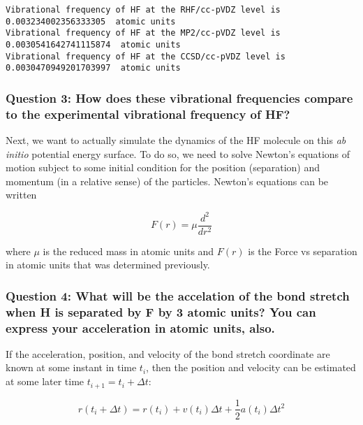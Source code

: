 \documentclass[11pt]{article}
\begin{document}
    \begin{Verbatim}[commandchars=\\\{\}]
Vibrational frequency of HF at the RHF/cc-pVDZ level is  0.003234002356333305  atomic units
Vibrational frequency of HF at the MP2/cc-pVDZ level is  0.0030541642741115874  atomic units
Vibrational frequency of HF at the CCSD/cc-pVDZ level is  0.0030470949201703997  atomic units

    \end{Verbatim}

    \subsubsection{Question 3: How does these vibrational frequencies
compare to the experimental vibrational frequency of
HF?}\label{question-3-how-does-these-vibrational-frequencies-compare-to-the-experimental-vibrational-frequency-of-hf}

Next, we want to actually simulate the dynamics of the HF molecule on
this \emph{ab} \emph{initio} potential energy surface. To do so, we need
to solve Newton's equations of motion subject to some initial condition
for the position (separation) and momentum (in a relative sense) of the
particles. Newton's equations can be written

\begin{equation}
F(r) = \mu \frac{d^2}{dr^2}
\end{equation}

where \(\mu\) is the reduced mass in atomic units and \(F(r)\) is the
Force vs separation in atomic units that was determined previously.

\subsubsection{Question 4: What will be the accelation of the bond
stretch when H is separated by F by 3 atomic units? You can express your
acceleration in atomic units,
also.}\label{question-4-what-will-be-the-accelation-of-the-bond-stretch-when-h-is-separated-by-f-by-3-atomic-units-you-can-express-your-acceleration-in-atomic-units-also.}

    If the acceleration, position, and velocity of the bond stretch
coordinate are known at some instant in time \(t_i\), then the position
and velocity can be estimated at some later time
\(t_{i+1} = t_i + \Delta t\):

\begin{equation}
r(t_i + \Delta t) = r(t_i) + v(t_i)\Delta t + \frac{1}{2}a(t_i)\Delta t^2
\end{equation}
\end{document}
